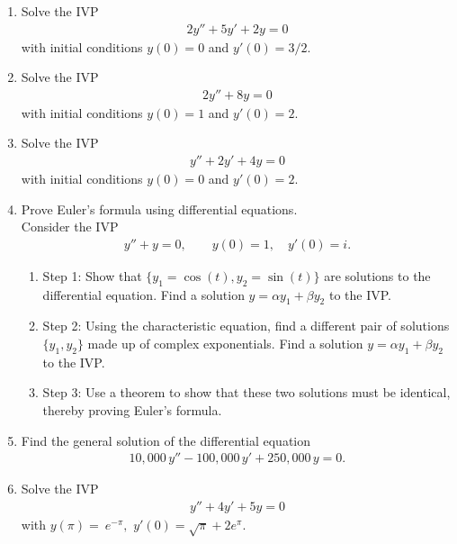 \documentclass{book}
\begin{document}
\begin{enumerate}

\item
  Solve the IVP
  \begin{align*}
  2 y'' + 5y' + 2y =0
  \end{align*}
  with initial conditions $y(0)=0$ and $y'(0)=3/2$.

\item
  Solve the IVP
  \begin{align*}
  2 y'' + 8y =0
  \end{align*}
  with initial conditions $y(0)=1$ and $y'(0)=2$.

\item
  Solve the IVP
  \begin{align*}
  y'' + 2y' + 4y=0
  \end{align*}
  with initial conditions $y(0)=0$ and $y'(0)=2$.

\item
  Prove Euler's formula using differential equations. \\
  Consider the IVP
  \begin{align*}
  y'' +y =0, \qquad y(0)=1, \quad y'(0)=i.
  \end{align*}
  \begin{enumerate}
    \item Step 1: Show that $\{y_1=\cos(t),y_2=\sin(t)\}$ are solutions
      to the differential equation. Find a solution $y=\alpha y_1 + \beta y_2$
      to the IVP.
    \item Step 2: Using the characteristic equation, find a different pair
      of solutions $\{y_1,y_2\}$ made up of complex exponentials. Find a
      solution $y=\alpha y_1 + \beta y_2$ to the IVP.
    \item Step 3: Use a theorem to show that these two solutions must be
      identical, thereby proving Euler's formula.
  \end{enumerate}

\item
  Find the general solution of the differential equation
  \begin{align*}
  10, \! 000 \, y'' - 100, \! 000 \, y' + 250, \! 000 \, y = 0.
  \end{align*}


\item
  Solve the IVP
  \begin{align*}
  y'' + 4y' + 5y = 0
  \end{align*}
  with $y(\pi) =\ e^{-\pi},$ $y' (0) = \sqrt{\pi} + 2e^\pi$.

\end{enumerate}
\end{document}
